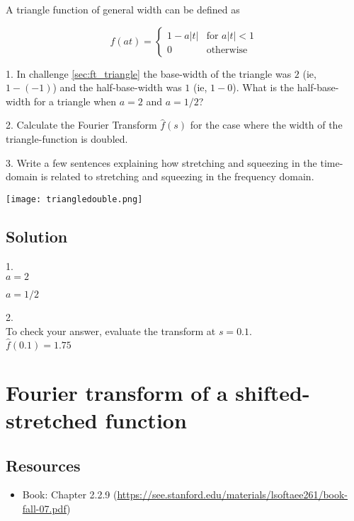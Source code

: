 A triangle function of general width can be defined as

\begin{equation}
    f(at)=
    \begin{cases}
        1 - a|t| & \text{for } a|t| < 1\\
        0 & \text{otherwise}
    \end{cases}
\end{equation}

1. In challenge \ref{sec:ft_triangle} the base-width of the triangle was $2$ (ie, $1-(-1)$) and the half-base-width was $1$ (ie, $1-0$). What is the half-base-width for a triangle when $a=2$ and $a=1/2$?

2. Calculate the Fourier Transform $\hat{f}(s)$ for the case where the width of the triangle-function is doubled.

3. Write a few sentences explaining how stretching and squeezing in the time-domain is related to stretching and squeezing in the frequency domain.

\texttt{[image: triangledouble.png]}

\subsection*{Solution}
1.\\
$a=2$\\

$a=1/2$\\

2.\\
To check your answer, evaluate the transform at $s=0.1$.\\
$\hat{f}(0.1)=1.75$




\newpage
\section{Fourier transform of a shifted-stretched function}
\label{sec:shiftstretch}

\subsection*{Resources}
\begin{itemize}
    \item Book: Chapter 2.2.9 (\url{https://see.stanford.edu/materials/lsoftaee261/book-fall-07.pdf})
\end{itemize}

